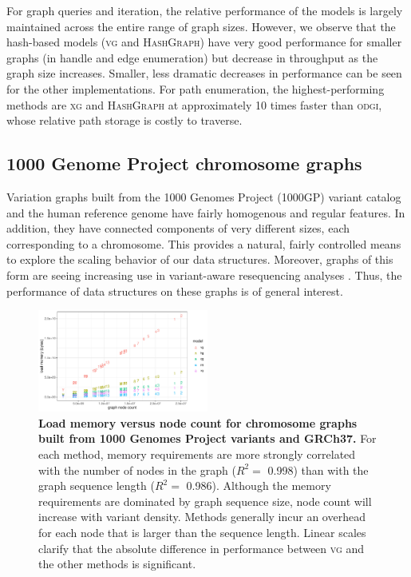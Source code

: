 \documentclass{bioinfo}
\begin{document}
For graph queries and iteration, the relative performance of the models is largely maintained across the entire range of graph sizes.
However, we observe that the hash-based models (\textsc{vg} and \textsc{HashGraph}) have very good performance for smaller graphs (in handle and edge enumeration) but decrease in throughput as the graph size increases.
Smaller, less dramatic decreases in performance can be seen for the other implementations.
For path enumeration, the highest-performing methods are \textsc{xg} and \textsc{HashGraph} at approximately 10 times faster than \textsc{odgi}, whose relative path storage is costly to traverse.

\subsection{1000 Genome Project chromosome graphs}

Variation graphs built from the 1000 Genomes Project (1000GP) variant catalog and the human reference genome have fairly homogenous and regular features.
In addition, they have connected components of very different sizes, each corresponding to a chromosome.
This provides a natural, fairly controlled means to explore the scaling behavior of our data structures.
Moreover, graphs of this form are seeing increasing use in variant-aware resequencing analyses \citep{crysnanto2019sequence}.
Thus, the performance of data structures on these graphs is of general interest.

\begin{figure}[p]
  \centering
  \includegraphics[width=0.5\textwidth]{figures/1000gp_chroms_node_count.pdf}
  \caption{
    \label{fig:1000GPchroms}
    \textbf{Load memory versus node count for chromosome graphs built from 1000 Genomes Project variants and GRCh37.}
    For each method, memory requirements are more strongly correlated with the number of nodes in the graph ($R^2 =$ 0.998) than with the graph sequence length ($R^2 =$ 0.986).
    Although the memory requirements are dominated by graph sequence size, node count will increase with variant density.
    Methods generally incur an overhead for each node that is larger than the sequence length.
    Linear scales clarify that the absolute difference in performance between \textsc{vg} and the other methods is significant.
    }
\end{figure}
\end{document}
